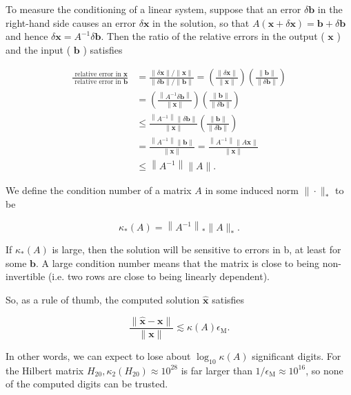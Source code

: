 \begin{definition}[Conditioning]
  To measure the conditioning of a linear system, suppose that an error \(\delta \mathbf{b}\) in the right-hand side causes an error \(\delta \mathbf{x}\) in the solution, so that \(A(\mathbf{x}+\delta \mathbf{x})=\mathbf{b}+\delta \mathbf{b}\) and hence \(\delta \mathbf{x}=A^{-1} \delta \mathbf{b}\). Then the ratio of the relative errors in the output ( \(\mathbf{x}\) ) and the input ( \(\mathbf{b}\) ) satisfies

\[
\begin{aligned}
\frac{\text { relative error in } \mathbf{x}}{\text { relative error in } \mathbf{b}} & =\frac{\|\delta \mathbf{x}\| /\|\mathbf{x}\|}{\|\delta \mathbf{b}\| /\|\mathbf{b}\|}=\left(\frac{\|\delta \mathbf{x}\|}{\|\mathbf{x}\|}\right)\left(\frac{\|\mathbf{b}\|}{\|\delta \mathbf{b}\|}\right) \\
& =\left(\frac{\left\|A^{-1} \delta \mathbf{b}\right\|}{\|\mathbf{x}\|}\right)\left(\frac{\|\mathbf{b}\|}{\|\delta \mathbf{b}\|}\right) \\
& \leq \frac{\left\|A^{-1}\right\|\|\delta \mathbf{b}\|}{\|\mathbf{x}\|}\left(\frac{\|\mathbf{b}\|}{\|\delta \mathbf{b}\|}\right) \\
& =\frac{\left\|A^{-1}\right\|\|\mathbf{b}\|}{\|\mathbf{x}\|}=\frac{\left\|A^{-1}\right\|\|A \mathbf{x}\|}{\|\mathbf{x}\|} \\
& \leq\left\|A^{-1}\right\|\|A\| .
\end{aligned}
\]
\end{definition}

\begin{definition}
  We define the condition number of a matrix \(A\) in some induced norm \(\|\cdot\|_*\) to be

\[
\kappa_*(A)=\left\|A^{-1}\right\|_*\|A\|_* .
\]

If \(\kappa_*(A)\) is large, then the solution will be sensitive to errors in b, at least for some \(\mathbf{b}\). A large condition number means that the matrix is close to being non- invertible (i.e. two rows are close to being linearly dependent).
\end{definition}

\begin{theorem}
  So, as a rule of thumb, the computed solution \(\hat{\mathbf{x}}\) satisfies

\[
\frac{\|\hat{\mathbf{x}}-\mathbf{x}\|}{\|\mathbf{x}\|} \lesssim \kappa(A) \epsilon_{\mathrm{M}} .
\]

In other words, we can expect to lose about \(\log _{10} \kappa(A)\) significant digits. For the Hilbert matrix \(H_{20}, \kappa_2\left(H_{20}\right) \approx 10^{28}\) is far larger than \(1 / \epsilon_{\mathrm{M}} \approx 10^{16}\), so none of the computed digits can be trusted.
\end{theorem}

